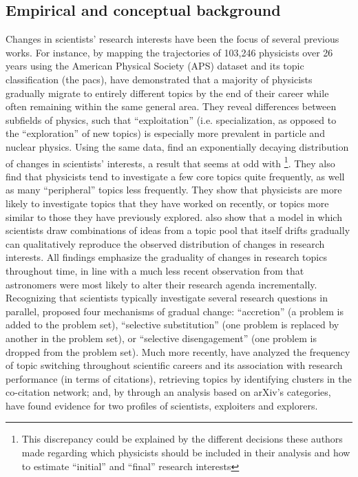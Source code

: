 \documentclass{article}
\begin{document}
\subsection{\label{sec:conceptual}Empirical and conceptual background}

Changes in scientists' research interests have been the focus of several previous works. For instance, by mapping the trajectories of 103,246 physicists over 26 years using the American Physical Society (APS) dataset and its topic classification (the \gls{pacs}), \citet{Aleta2019} have demonstrated that a majority of physicists gradually migrate to entirely different topics by the end of their career while often remaining within the same general area. They reveal differences between subfields of physics, such that ``exploitation'' (i.e. specialization, as opposed to the ``exploration'' of new topics) is especially more prevalent in particle and nuclear physics.  Using the same data, \citet{Jia2017} find an exponentially decaying distribution of changes in scientists' interests, a result that seems at odd with \citealt{Aleta2019}\footnote{This discrepancy could be explained by the different decisions these authors made regarding which physicists should be included in their analysis and how to estimate ``initial'' and ``final'' research interests}. They also find that physicists tend to investigate a few core topics quite frequently, as well as many ``peripheral'' topics less frequently. They show that physicists are more likely to investigate topics that they have worked on recently, or topics more similar to those they have previously explored. \citet{Jia2017} also show that a model in which scientists draw combinations of ideas from a topic pool that itself drifts gradually can qualitatively reproduce the observed distribution of changes in research interests. All findings emphasize the graduality of changes in research topics throughout time, in line with a much less recent observation from \citet{Gieryn1978} that astronomers were most likely to alter their research agenda incrementally. Recognizing that scientists typically investigate several research questions in parallel, \citeauthor{Gieryn1978} proposed four mechanisms of gradual change: ``accretion'' (a problem is added to the problem set),  ``selective substitution'' (one problem is replaced by another in the problem set), or ``selective disengagement'' (one problem is dropped from the problem set). Much more recently, \citet{Zeng2019} have analyzed the frequency of topic switching throughout scientific careers and its association with research performance (in terms of citations), retrieving topics by identifying clusters in the co-citation network; and,  by through an analysis based on arXiv's categories, \citet{Chakresh2023} have found evidence for two profiles of scientists, exploiters and explorers.
\end{document}
